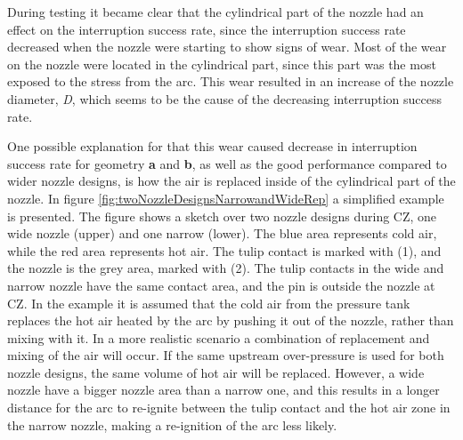 \documentclass[10pt,b5paper,twoside]{article}
\begin{document}
During testing it became clear that the cylindrical part of the nozzle had an effect on the interruption success rate, since the interruption success rate decreased when the nozzle were starting to show signs of wear. Most of the wear on the nozzle were located in the cylindrical part, since this part was the most exposed to the stress from the arc. This wear resulted in an increase of the nozzle diameter, \textit{D}, which seems to be the cause of the decreasing interruption success rate.

One possible explanation for that this wear caused decrease in interruption success rate for geometry \textbf{a} and \textbf{b}, as well as the good performance compared to wider nozzle designs, is how the air is replaced inside of the cylindrical part of the nozzle. In figure \ref{fig:twoNozzleDesignsNarrowandWideRep} a simplified example is presented. The figure shows a sketch over two nozzle designs during CZ, one wide nozzle (upper) and one narrow (lower). The blue area represents cold air, while the red area represents hot air. The tulip contact is marked with (1), and the nozzle is the grey area, marked with (2). The tulip contacts in the wide and narrow nozzle have the same contact area, and the pin is outside the nozzle at CZ. In the example it is assumed that the cold air from the pressure tank replaces the hot air heated by the arc by pushing it out of the nozzle, rather than mixing with it. In a more realistic scenario a combination of replacement and mixing of the air will occur. If the same upstream over-pressure is used for both nozzle designs, the same volume of hot air will be replaced. However, a wide nozzle have a bigger nozzle area than a narrow one, and this results in a longer distance for the arc to re-ignite between the tulip contact and the hot air zone in the narrow nozzle, making a re-ignition of the arc less likely.
\end{document}
